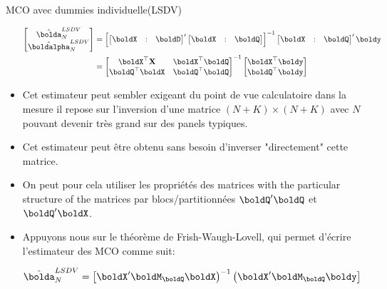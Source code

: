 \begin{frame}[allowframebreaks]{MCO avec dummies individuelle(LSDV)}
\begin{itemize}
          \begin{align*}
            \begin{bmatrix}
            \hat{\bolda}^{LSDV}_N\\
            \hat{\boldalpha}^{LSDV}_N
            \end{bmatrix}
            &=\left[
            \begin{bmatrix}
            \boldX&:&  \boldD
            \end{bmatrix}^\prime
            \begin{bmatrix}
            \boldX&:& \boldQ
            \end{bmatrix}\right]^{-1}
            \begin{bmatrix}
            \boldX&:& \boldQ
            \end{bmatrix}^\prime\boldy\\
            &=
            \begin{bmatrix}
            \boldX^\top \bold X & \boldX^\top\boldQ\\
            \boldQ^\top\boldX&\boldQ^\top\boldQ
            \end{bmatrix}^{-1}
            \begin{bmatrix}
            \boldX^\top\boldy\\
            \boldQ^\top\boldy
            \end{bmatrix}
            \end{align*}

            \item Cet estimateur peut sembler exigeant du point 
de vue calculatoire dans la mesure il repose sur
 l'inversion d'une matrice $(N +K)\times (N+ K)$ avec $N$ 
 pouvant devenir très grand sur des panels typiques.
    
 \item Cet estimateur peut être obtenu sans besoin d'inverser  "directement" cette matrice. 
 
 \item On peut pour cela utiliser les propriétés des matrices with the particular structure of the matrices par
 blocs/partitionnées $\boldQ^\prime\boldQ$ et $\boldQ^\prime\boldX$. 

\item Appuyons nous sur le théorème  de Frish-Waugh-Lovell,  
qui permet d'écrire l'estimateur des MCO comme suit:

\begin{align*}
    \hat{\bolda}^{LSDV}_N
    &=
    \left[
    \boldX^\prime\boldM_\boldQ\boldX
    \right)^{-1}
    \left(
    \boldX^\prime\boldM_\boldQ\boldy
    \right]
    \end{align*}


\end{itemize}
\end{frame}
